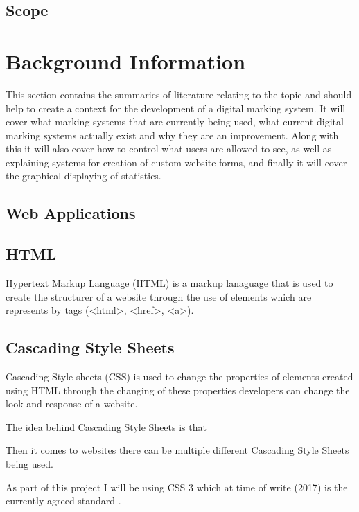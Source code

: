 \documentclass[12pt]{article}  %
\begin{document}
\subsection{Scope}





\newpage
\section{Background Information}
This section contains the summaries of literature relating to the topic and should help to create a context for the development of a digital marking system. It will cover what marking systems that are currently being used, what current digital marking systems actually exist and why they are an improvement. Along with this it will also cover how to control what users are allowed to see, as well as explaining systems for creation of custom website forms, and finally it will cover the graphical displaying of statistics. 


\subsection{Web Applications}

\subsection{HTML}
Hypertext Markup Language (HTML) is a markup lanaguage that is used to create the structurer of a website through the use of elements which are represents by tags (\textless html\textgreater, \textless href\textgreater, \textless a\textgreater). 

\subsection{Cascading Style Sheets}
Cascading Style sheets (CSS) is used to change the properties of elements created using HTML through the changing of these properties developers can change the look and response of a website. 

The idea behind Cascading Style Sheets is that   

Then it comes to websites there can be multiple different Cascading Style Sheets being used.  

As part of this project I will be using CSS 3 which at time of write (2017) is the currently agreed standard \cite{noauthor_css_nodate}.
\end{document}
